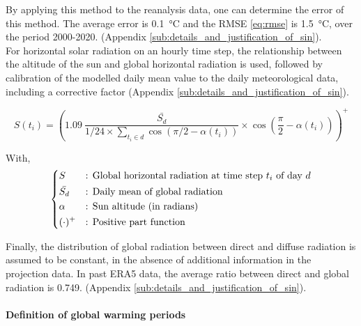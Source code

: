 \documentclass[11pt]{article}
\begin{document}
        By applying this method to the reanalysis data, one can determine the error of this method. The average error is \SI{0.1}{\celsius} and the RMSE \eqref{eq:rmse} is \SI{1.5}{\celsius}, over the period 2000-2020. (Appendix \ref{sub:details_and_justification_of_sin}). \\

        For horizontal solar radiation on an hourly time step, the relationship between the altitude of the sun and global horizontal radiation is used, followed by calibration of the modelled daily mean value to the daily meteorological data, including a corrective factor (Appendix \ref{sub:details_and_justification_of_sin}).

        \begin{equation}\label{eq:solar_eq}
             S(t_i) = \left(1.09~\frac{\bar{S_d}}{1/24\times\sum_{t_i \in d} \cos\left(\pi/2-\alpha(t_i)\right)} \times \cos\left(\frac{\pi}{2}-\alpha(t_i)\right)\right)^+
        \end{equation} 

        \noindent
        With,
        $$
        \begin{dcases}
            S&\text{: Global horizontal radiation at time step $t_i$ of day $d$}\\
            \bar{S_d}&\text{: Daily mean of global radiation}\\
            \alpha&\text{: Sun altitude (in radians)}\\
            (\cdot)^+&\text{: Positive part function}\\
        \end{dcases}
        $$

        Finally, the distribution of global radiation between direct and diffuse radiation is assumed to be constant, in the absence of additional information in the projection data. In past ERA5 data, the average ratio between direct and global radiation is \num{0.749}. (Appendix \ref{sub:details_and_justification_of_sin}). 

        \paragraph{Definition of global warming periods}\mbox{}\\ %
        \label{par:gw_periods}
\end{document}
